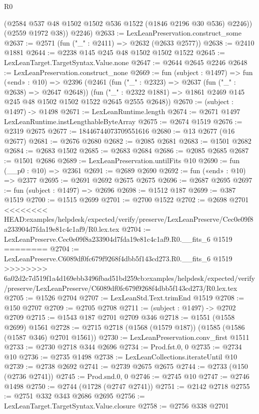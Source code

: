 \begin{lexlean}{R0}
\begin{coremodule}
{{{{{{{{{{{{{{{{{{{{{{{{{{{{{{{{{{{{{{{{{{{{{{{{{{{{{{{{{{{{{{{{{{{{{{{{{          (@2584 @537 @48 @1502 @1502 @536 @1522 (@1846 @2196 @30 @536) @2246))
        (@2559 @1972 @38))
      @2246)
@2633 := LexLeanPreservation.construct_some
@2637 := @2571 (fun ("_" : @2411) => @2632 (@2633 @2577))
@2638 := @2410 @1881
@2644 := @2238 @145 @245 @48 @1502 @1502 @1522
@2645 := LexLeanTarget.TargetSyntax.Value.none
@2647 := @2644 @2645 @2246
@2648 := LexLeanPreservation.construct_none
@2669 := fun (subject : @1497) =>
  fun («end» : @10) =>
  @2396
    (@2461
      (fun ("_" : @2323) => @2637 (fun ("_" : @2638) => @2647 @2648))
      (fun ("_" : @2322 @1881) => @1861 @2469 @145 @245 @48 @1502 @1502 @1522 @2645 @2555 @2648))
@2670 := (subject : @1497) -> @1498
@2671 := LexLeanRuntime.length
@2674 := @2671 @1497 LexLeanRuntime.instLengthableByteArray
@2675 := @2674 @1519
@2676 := @2319 @2675
@2677 := 18446744073709551616
@2680 := @13 @2677 (@16 @2677)
@2681 := @2676 @2680
@2682 := @2085 @2681
@2683 := @1501 @2682
@2684 := @2683 @1502
@2685 := @2683 @2684
@2686 := @2085 @2685
@2687 := @1501 @2686
@2689 := LexLeanPreservation.untilFits @10
@2690 := fun (__p0 : @10) => @2361
@2691 := @2689 @2690
@2692 := fun («end» : @10) => @2377
@2695 := @2691 @2692 @2675 @2675
@2696 := @2687 @2695
@2697 := fun (subject : @1497) => @2696
@2698 := @1512 @187
@2699 := @387 @1519
@2700 := @1515 @2699
@2701 := @2700 @1522
@2702 := @2698 @2701
<<<<<<<< HEAD:examples/helpdesk/expected/verify/preserve/LexLeanPreserve/Cec0e09f8a233904d7fda19e81c4c1af9/R0.lex.tex
@2704 := LexLeanPreserve.Cec0e09f8a233904d7fda19e81c4c1af9.R0.__fits_6 @1519
========
@2704 := LexLeanPreserve.C6089df0fc679f9268f4dbb5f143cd273.R0.__fits_6 @1519
>>>>>>>> 6a02d2c7d519f1a4d169ebb3496fbad51bd259cb:examples/helpdesk/expected/verify/preserve/LexLeanPreserve/C6089df0fc679f9268f4dbb5f143cd273/R0.lex.tex
@2705 := @1526 @2704
@2707 := LexLeanStd.Text.trimEnd @1519
@2708 := @150 @2707
@2709 := @2705 @2708
@2711 := (subject : @1497) -> @2702 @2709
@2715 := @1543 @187 @2701 @2709 @346
@2718 := @1551 (@1558 @2699) @1561
@2728 := @2715 @2718 (@1568 (@1579 @187)) (@1585 (@1586 (@1587 @346) @2701 @1561))
@2730 := LexLeanPreservation.conv_first @1511
@2733 := @2730 @2718 @344 @2696
@2734 := Prod.fst.{0, 0}
@2735 := @2734 @10
@2736 := @2735 @1498
@2738 := LexLeanCollections.iterateUntil @10
@2739 := @2738 @2692
@2741 := @2739 @2675 @2675
@2744 := @2733 (@150 (@2736 @2741))
@2745 := Prod.snd.{0, 0}
@2746 := @2745 @10
@2747 := @2746 @1498
@2750 := @2744 (@1728 (@2747 @2741))
@2751 := @2142 @2718
@2755 := @2751 @332 @343 @2686 @2695
@2756 := LexLeanTarget.TargetSyntax.Value.closure
@2758 := @2756 @338 @2701
}}}}}}}}}}}}}}}}}}}}}}}}}}}}}}}}}}}}}}}}}}}}}}}}}}}}}}}}}}}}}}}}}}}}}}}}}
\end{coremodule}
\end{lexlean}
